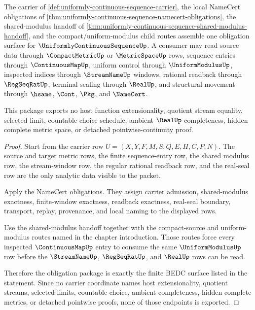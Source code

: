 \begin{theorem}
\label{thm:uniformly-continuous-sequence-obligation-closure-package}
The carrier of \autoref{def:uniformly-continuous-sequence-carrier}, the local NameCert obligations of \autoref{thm:uniformly-continuous-sequence-namecert-obligations}, the shared-modulus handoff of \autoref{thm:uniformly-continuous-sequence-shared-modulus-handoff}, and the compact/uniform-modulus child routes assemble one obligation surface for $\UniformlyContinuousSequenceUp$. A consumer may read source data through $\CompactMetricUp$ or $\MetricSpaceUp$ rows, sequence entries through $\ContinuousMapUp$, uniform control through $\UniformModulusUp$, inspected indices through $\StreamNameUp$ windows, rational readback through $\RegSeqRatUp$, terminal sealing through $\RealUp$, and structural movement through $\hsame$, $\Cont$, $\Pkg$, and $\NameCert$.

This package exports no host function extensionality, quotient stream equality, selected limit, countable-choice schedule, ambient $\RealUp$ completeness, hidden complete metric space, or detached pointwise-continuity proof.
\end{theorem}
\begin{proof}
Start from the carrier row $U=(X,Y,F,M,S,Q,E,H,C,P,N)$. The source and target metric rows, the finite sequence-entry row, the shared modulus row, the stream-window row, the regular rational readback row, and the real-seal row are the only analytic data visible to the packet.

Apply the NameCert obligations. They assign carrier admission, shared-modulus exactness, finite-window exactness, readback exactness, real-seal boundary, transport, replay, provenance, and local naming to the displayed rows.

Use the shared-modulus handoff together with the compact-source and uniform-modulus routes named in the chapter introduction. Those routes force every inspected $\ContinuousMapUp$ entry to consume the same $\UniformModulusUp$ row before the $\StreamNameUp$, $\RegSeqRatUp$, and $\RealUp$ rows can be read.

Therefore the obligation package is exactly the finite BEDC surface listed in the statement. Since no carrier coordinate names host extensionality, quotient streams, selected limits, countable choice, ambient completeness, hidden complete metrics, or detached pointwise proofs, none of those endpoints is exported.
\end{proof}

